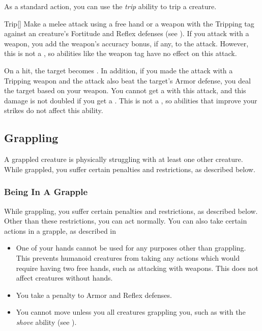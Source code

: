         \label{Trip} As a standard action, you can use the \textit{trip} ability to trip a creature.

        \begin{activeability}{Trip}[]
            \rankline
            Make a melee attack using a free hand or a weapon with the Tripping tag against an creature's Fortitude and Reflex defenses (see ).
            If you attack with a weapon, you add the weapon's accuracy bonus, if any, to the attack.
            However, this is not a , so abilities like the  weapon tag have no effect on this attack.

            On a hit, the target becomes \prone.
            In addition, if you made the attack with a Tripping weapon and the attack also beat the target's Armor defense, you deal the target  based on your weapon.
            You cannot get a  with this attack, and this damage is not doubled if you get a .
            This is not a , so abilities that improve your strikes do not affect this ability.
        \end{activeability}

    \subsection{Grappling}\label{Grappling}
        A grappled creature is physically struggling with at least one other creature.
        While grappled, you suffer certain penalties and restrictions, as described below.

        \subsubsection{Being In A Grapple}
            While grappling, you suffer certain penalties and restrictions, as described below. Other than these restrictions, you can act normally. You can also take certain actions in a grapple, as described in 
            \begin{itemize}
                \item One of your hands cannot be used for any purposes other than grappling.
                    This prevents humanoid creatures from taking any actions which would require having two free hands, such as attacking with  weapons.
                    This does not affect creatures without hands.
                \item You take a  penalty to Armor and Reflex defenses.
                \item You cannot move unless you  all creatures grappling you, such as with the \textit{shove} ability (see ).
            \end{itemize}

